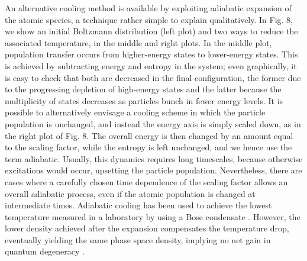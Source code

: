 \documentclass[pra,letterpaper,twocolumn,showpacs,superscriptaddress]{revtex4}
\begin{document}
An alternative cooling method is available by exploiting adiabatic expansion of the atomic species, a technique 
rather simple to  explain qualitatively. In Fig. 8, we show an initial Boltzmann distribution (left plot) and two ways to reduce the associated 
temperature, in the middle and right plots. In the middle plot, population transfer occurs from higher-energy states to lower-energy states. 
This is achieved by subtracting energy and entropy in the system; even graphically, it is easy to check that both are decreased in the final 
configuration, the former due to the progressing depletion of high-energy states and the latter because the multiplicity of states decreases  
as particles bunch in fewer energy levels. It is possible to alternatively envisage a cooling scheme in which the particle population is unchanged, and 
instead the energy axis is simply scaled down, as in the right plot of Fig. 8. The overall energy is then changed by an amount equal to the scaling factor, 
while the entropy is left unchanged, and we hence use the term adiabatic. Usually, this dynamics requires long timescales, because otherwise 
excitations would occur, upsetting the particle population. Nevertheless, there are cases where a carefully chosen time dependence of the scaling factor 
allows an overall adiabatic process, even if the atomic population is changed at intermediate times. Adiabatic cooling has been used to achieve 
the lowest temperature measured in a laboratory by using a Bose condensate \cite{Leanhardt2003}. However, the lower density achieved after 
the expansion compensates the temperature drop, eventually yielding the same phase space density, implying no net gain in quantum degeneracy \cite{Ketterle1992}. 
\end{document}
